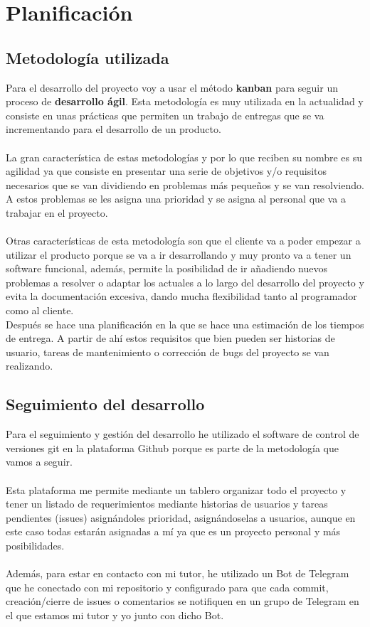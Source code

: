 \chapter{Planificación} \label{sec:planificacion}

\section{Metodología utilizada} \label{sec:metodologia}
Para el desarrollo del proyecto voy a usar el método \textbf{kanban} para seguir un proceso de \textbf{desarrollo ágil}.
Esta metodología es muy utilizada en la actualidad y consiste en unas prácticas que permiten un trabajo de entregas que se va incrementando para el desarrollo de un producto. \\\\
La gran característica de estas metodologías y por lo que reciben su nombre es su agilidad ya que consiste en presentar una serie de objetivos y/o requisitos necesarios que se van dividiendo en problemas más pequeños 
y se van resolviendo. A estos problemas se les asigna una prioridad y se asigna al personal que va a trabajar en el proyecto.\\\\
Otras características de esta metodología son que el cliente va a poder empezar a utilizar el producto porque se va a ir desarrollando y muy pronto va a tener un software funcional, 
además, permite la posibilidad de ir añadiendo nuevos problemas a resolver o adaptar los actuales a lo largo del desarrollo del proyecto y evita la documentación excesiva, dando mucha flexibilidad tanto al programador como al cliente.\\

Después se hace una planificación en la que se hace una estimación de los tiempos de entrega.
A partir de ahí estos requisitos que bien pueden ser historias de usuario, tareas de mantenimiento o corrección de bugs del proyecto se van realizando.
 
\newpage
\section{Seguimiento del desarrollo} \label{sec:seguimiento}

Para el seguimiento y gestión del desarrollo he utilizado el software de control de versiones
git \cite{git} en la plataforma Github \cite{Github} porque es parte de la metodología que vamos a seguir.\\\\
Esta plataforma me permite mediante un tablero organizar todo el proyecto
y tener un listado de requerimientos mediante historias de usuarios y tareas pendientes (issues) asignándoles
prioridad, asignándoselas a usuarios, aunque en este caso todas estarán asignadas a mí ya que es un proyecto personal 
y más posibilidades.\\\\
Además, para estar en contacto con mi tutor, he utilizado un Bot de Telegram que he conectado con mi repositorio y 
configurado para que cada commit, creación/cierre de issues o comentarios se notifiquen en un grupo de Telegram en el que estamos mi tutor y yo
junto con dicho Bot.\\

